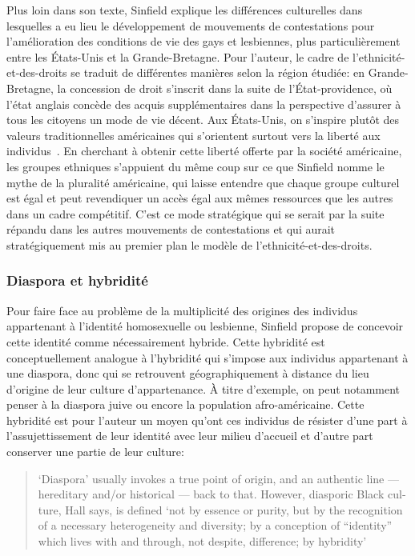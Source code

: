 Plus loin dans son texte, Sinfield explique les différences culturelles dans lesquelles a eu lieu le développement de mouvements de contestations pour l'amélioration des conditions de vie des gays et lesbiennes, plus particulièrement entre les États-Unis et la Grande-Bretagne. 
Pour l'auteur, le cadre de l'ethnicité-et-des-droits se traduit de différentes manières selon la région étudiée: en Grande-Bretagne, la concession de droit s'inscrit dans la suite de l'État-providence, où l'état anglais concède des acquis supplémentaires dans la perspective d'assurer à tous les citoyens un mode de vie décent. 
Aux États-Unis, on s'inspire plutôt des valeurs traditionnelles américaines qui s'orientent surtout vers la liberté aux individus~\citep[274]{Sinfield1996}. 
En cherchant à obtenir cette liberté offerte par la société américaine, les groupes ethniques s'appuient du même coup sur ce que Sinfield nomme le mythe de la pluralité américaine, qui laisse entendre que chaque groupe culturel est égal et peut revendiquer un accès égal aux mêmes ressources que les autres dans un cadre compétitif. 
C'est ce mode stratégique qui se serait par la suite répandu dans les autres mouvements de contestations et qui aurait stratégiquement mis au premier plan le modèle de l'ethnicité-et-des-droits.

\subsubsection{Diaspora et hybridité}
\label{sub:diaspora_et_hybridit_} Pour faire face au problème de la multiplicité des origines des individus appartenant à l'identité homosexuelle ou lesbienne, Sinfield propose de concevoir cette identité comme nécessairement hybride. 
Cette hybridité est conceptuellement analogue à l'hybridité qui s'impose aux individus appartenant à une diaspora, donc qui se retrouvent géographiquement à distance du lieu d'origine de leur culture d'appartenance. 
À titre d'exemple, on peut notamment penser à la diaspora juive ou encore la population afro-américaine.
Cette hybridité est pour l'auteur un moyen qu'ont ces individus de résister d'une part à l'assujettissement de leur identité avec leur milieu d'accueil et d'autre part conserver une partie de leur culture: \foreignblockquote{english}[{\cite[278]{Sinfield1996}}][.]{`Diaspora' \textelp{}   usually invokes a true point of origin, and an authentic line --- hereditary   and/or historical --- back to that. However, diasporic Black culture, Hall says, is defined `not by essence or purity, but by the recognition of a necessary heterogeneity and diversity; by a conception of ``identity'' which lives with and through, not despite, difference; by hybridity'}

